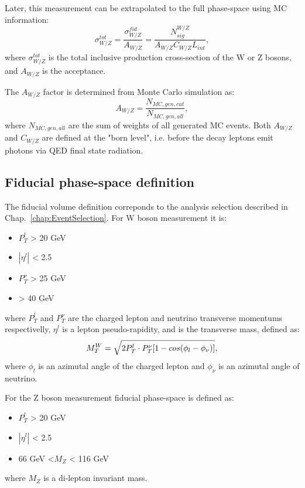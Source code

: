 Later, this measurement can be extrapolated to the full phase-space using MC information:
\begin{equation}
\sigma^{tot}_{W/Z}= \frac{\sigma^{fid}_{W/Z}}{A_{W/Z}}= \frac{N^{W/Z}_{sig}}{A_{W/Z}C_{W/Z}L_{int}},
\end{equation}
where $\sigma^{tot}_{W/Z}$ is the total inclusive production cross-section of the W or Z bosons, and $A_{W/Z}$  is the acceptance. 

The $A_{W/Z}$ factor is determined from Monte Carlo simulation as: 
\begin{equation}
A_{W/Z}=\frac{N_{MC,gen, cut}}{N_{MC,gen,all}},
\end{equation}
where $N_{MC,gen,all}$ are the sum of weights of all generated MC events. Both $A_{W/Z}$ and $C_{W/Z}$ are defined at the "born level", i.e. before the decay leptons emit photons via QED final state radiation.

\subsection{Fiducial phase-space definition}
The fiducial volume definition correponds to the analysis selection described in Chap.~\ref{chap:EventSelection}. For W boson measurement it is:
\begin{itemize}
\item $P_T^l$ > 20 GeV
\item $|\eta^l|$ < 2.5 
\item $P_T^{\nu}$ > 25 GeV
\item \mtw > 40 GeV
\end{itemize}
where $P_T^l$ and $P_T^{\nu}$ are the charged lepton and neutrino transverse momentums respectivelly, $\eta^l $ is a lepton pseudo-rapidity, and \mtw is the transverse mass, defined as:
\begin{equation}\label{Eq:mtW}
M_T^W = \sqrt{ 2 P_T^l \cdot P_T^{\nu} [ 1 - cos (\phi_l - \phi_{\nu})]},
\end{equation}
where $\phi_l$ is an azimutal angle of the charged lepton and $\phi_{\nu}$ is an azimutal angle of neutrino.

For the Z boson measurement fiducial phase-space is defined as:
\begin{itemize}
\item $P_T^l$ > 20 GeV
\item $|\eta^l|$ < 2.5 
\item 66 GeV <$M_{Z}$ < 116 GeV
\end{itemize}
where $M_{Z}$ is a di-lepton invariant mass. 

